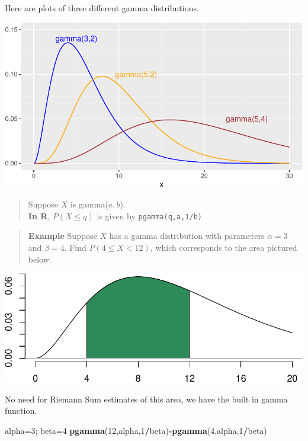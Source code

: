 \documentclass[
]{book}
\newenvironment{Shaded}{\begin{snugshade}}{\end{snugshade}}
\newcommand{\DecValTok}[1]{\textcolor[rgb]{0.00,0.00,0.81}{#1}}
\newcommand{\FunctionTok}[1]{\textcolor[rgb]{0.13,0.29,0.53}{\textbf{#1}}}
\newcommand{\NormalTok}[1]{#1}
\newcommand{\OtherTok}[1]{\textcolor[rgb]{0.56,0.35,0.01}{#1}}
\newcommand{\SpecialCharTok}[1]{\textcolor[rgb]{0.81,0.36,0.00}{\textbf{#1}}}
\theoremstyle{definition}
\theoremstyle{definition}
\theoremstyle{definition}
\theoremstyle{definition}
\theoremstyle{remark}
\begin{document}
Here are plots of three different gamma distributions.

\begin{center}\includegraphics{math340-notes_files/figure-latex/unnamed-chunk-189-1} \end{center}

\begin{quote}
Suppose \(X\) is gamma(\(a,b\)).\\
\textbf{In R}, \(P(X \leq q)\) is given by \texttt{pgamma(q,a,1/b)}
\end{quote}

\begin{quote}
\textbf{Example} Suppose \(X\) has a gamma distribution with parameters \(\alpha=3\) and \(\beta = 4\). Find \(P(4\leq X < 12)\), which corresponds to the area pictured below.
\end{quote}

\begin{center}\includegraphics{math340-notes_files/figure-latex/unnamed-chunk-190-1} \end{center}

No need for Riemann Sum estimates of this area, we have the built in gamma function.

\begin{Shaded}
\begin{Highlighting}[]
\NormalTok{alpha}\OtherTok{=}\DecValTok{3}\NormalTok{; beta}\OtherTok{=}\DecValTok{4}
\FunctionTok{pgamma}\NormalTok{(}\DecValTok{12}\NormalTok{,alpha,}\DecValTok{1}\SpecialCharTok{/}\NormalTok{beta)}\SpecialCharTok{{-}}\FunctionTok{pgamma}\NormalTok{(}\DecValTok{4}\NormalTok{,alpha,}\DecValTok{1}\SpecialCharTok{/}\NormalTok{beta)}
\end{Highlighting}
\end{Shaded}
\end{document}
